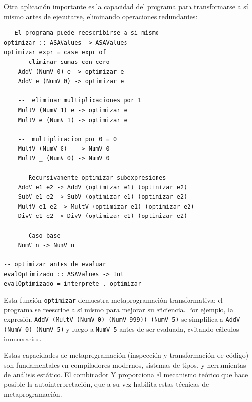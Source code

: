 \documentclass[11pt]{article}
\begin{document}
Otra aplicación importante es la capacidad del programa para transformarse a sí mismo antes de ejecutarse, eliminando operaciones redundantes:

\begin{lstlisting}[caption={Transformación y optimización de programas}]
-- El programa puede reescribirse a si mismo
optimizar :: ASAValues -> ASAValues
optimizar expr = case expr of
    -- eliminar sumas con cero
    AddV (NumV 0) e -> optimizar e
    AddV e (NumV 0) -> optimizar e

    --  eliminar multiplicaciones por 1
    MultV (NumV 1) e -> optimizar e
    MultV e (NumV 1) -> optimizar e

    --  multiplicacion por 0 = 0
    MultV (NumV 0) _ -> NumV 0
    MultV _ (NumV 0) -> NumV 0

    -- Recursivamente optimizar subexpresiones
    AddV e1 e2 -> AddV (optimizar e1) (optimizar e2)
    SubV e1 e2 -> SubV (optimizar e1) (optimizar e2)
    MultV e1 e2 -> MultV (optimizar e1) (optimizar e2)
    DivV e1 e2 -> DivV (optimizar e1) (optimizar e2)

    -- Caso base
    NumV n -> NumV n

-- optimizar antes de evaluar
evalOptimizado :: ASAValues -> Int
evalOptimizado = interprete . optimizar
\end{lstlisting}

Esta función \texttt{optimizar} demuestra metaprogramación transformativa: el programa se reescribe a sí mismo para mejorar su eficiencia. Por ejemplo, la expresión \texttt{AddV (MultV (NumV 0) (NumV 999)) (NumV 5)} se simplifica a \texttt{AddV (NumV 0) (NumV 5)} y luego a \texttt{NumV 5} antes de ser evaluada, evitando cálculos innecesarios.

Estas capacidades de metaprogramación (inspección y transformación de código) son fundamentales en compiladores modernos, sistemas de tipos, y herramientas de análisis estático. El combinador Y proporciona el mecanismo teórico que hace posible la autointerpretación, que a su vez habilita estas técnicas de metaprogramación.

\end{document}
